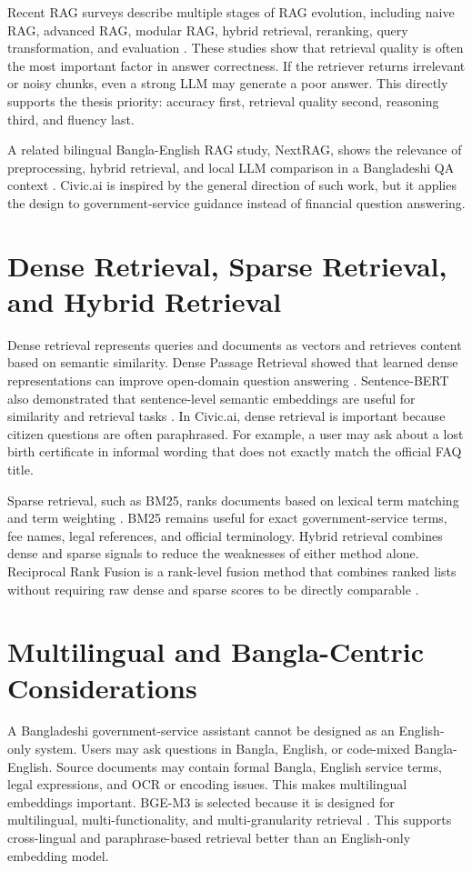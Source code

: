 Recent RAG surveys describe multiple stages of RAG evolution, including naive RAG, advanced RAG, modular RAG, hybrid retrieval, reranking, query transformation, and evaluation \cite{gao2023rag_survey,gupta2024rag_survey}. These studies show that retrieval quality is often the most important factor in answer correctness. If the retriever returns irrelevant or noisy chunks, even a strong LLM may generate a poor answer. This directly supports the thesis priority: accuracy first, retrieval quality second, reasoning third, and fluency last.

A related bilingual Bangla-English RAG study, NextRAG, shows the relevance of preprocessing, hybrid retrieval, and local LLM comparison in a Bangladeshi QA context \cite{nextrag2025}. Civic.ai is inspired by the general direction of such work, but it applies the design to government-service guidance instead of financial question answering.

\section{Dense Retrieval, Sparse Retrieval, and Hybrid Retrieval}
Dense retrieval represents queries and documents as vectors and retrieves content based on semantic similarity. Dense Passage Retrieval showed that learned dense representations can improve open-domain question answering \cite{karpukhin2020dpr}. Sentence-BERT also demonstrated that sentence-level semantic embeddings are useful for similarity and retrieval tasks \cite{reimers2019sbert}. In Civic.ai, dense retrieval is important because citizen questions are often paraphrased. For example, a user may ask about a lost birth certificate in informal wording that does not exactly match the official FAQ title.

Sparse retrieval, such as BM25, ranks documents based on lexical term matching and term weighting \cite{robertson2009bm25}. BM25 remains useful for exact government-service terms, fee names, legal references, and official terminology. Hybrid retrieval combines dense and sparse signals to reduce the weaknesses of either method alone. Reciprocal Rank Fusion is a rank-level fusion method that combines ranked lists without requiring raw dense and sparse scores to be directly comparable \cite{cormack2009rrf}.

\section{Multilingual and Bangla-Centric Considerations}
A Bangladeshi government-service assistant cannot be designed as an English-only system. Users may ask questions in Bangla, English, or code-mixed Bangla-English. Source documents may contain formal Bangla, English service terms, legal expressions, and OCR or encoding issues. This makes multilingual embeddings important. BGE-M3 is selected because it is designed for multilingual, multi-functionality, and multi-granularity retrieval \cite{chen2024bgem3}. This supports cross-lingual and paraphrase-based retrieval better than an English-only embedding model.


